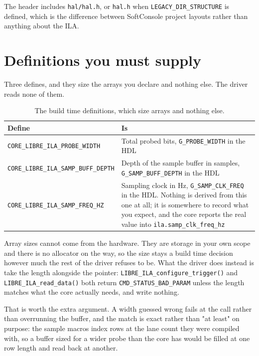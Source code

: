 \documentclass[../manual.tex]{subfiles}
\begin{document}
The header includes \texttt{hal/hal.h}, or \texttt{hal.h} when \texttt{LEGACY\_DIR\_STRUCTURE} is defined, which is the difference between SoftConsole project layouts rather than anything about the ILA.

\section{Definitions you must supply}
\label{sec:c_defs}

Three defines, and they size the arrays you declare and nothing else. The driver reads none of them.

\begin{table}[H]
    \centering
    \begin{tabularx}{\textwidth}{|l|X|}
        \hline
        \rowcolor{gray!40} \textbf{Define} & \textbf{Is} \\
        \hline
        \texttt{CORE\_LIBRE\_ILA\_PROBE\_WIDTH} & Total probed bits, \texttt{G\_PROBE\_WIDTH} in the HDL \\
        \hline
        \texttt{CORE\_LIBRE\_ILA\_SAMP\_BUFF\_DEPTH} & Depth of the sample buffer in samples, \texttt{G\_SAMP\_BUFF\_DEPTH} in the HDL \\
        \hline
        \texttt{CORE\_LIBRE\_ILA\_SAMP\_FREQ\_HZ} & Sampling clock in Hz, \texttt{G\_SAMP\_CLK\_FREQ} in the HDL. Nothing is derived from this one at all; it is somewhere to record what you expect, and the core reports the real value into \texttt{ila.samp\_clk\_freq\_hz} \\
        \hline
    \end{tabularx}
    \caption{The build time definitions, which size arrays and nothing else.}
    \label{tab:c_defs}
\end{table}

Array sizes cannot come from the hardware. They are storage in your own scope and there is no allocator on the way, so the size stays a build time decision however much the rest of the driver refuses to be. What the driver does instead is take the length alongside the pointer: \texttt{LIBRE\_ILA\_configure\_trigger()} and \texttt{LIBRE\_ILA\_read\_data()} both return \texttt{CMD\_STATUS\_BAD\_PARAM} unless the length matches what the core actually needs, and write nothing.

That is worth the extra argument. A width guessed wrong fails at the call rather than overrunning the buffer, and the match is exact rather than "at least" on purpose: the sample macros index rows at the lane count they were compiled with, so a buffer sized for a wider probe than the core has would be filled at one row length and read back at another.
\end{document}
